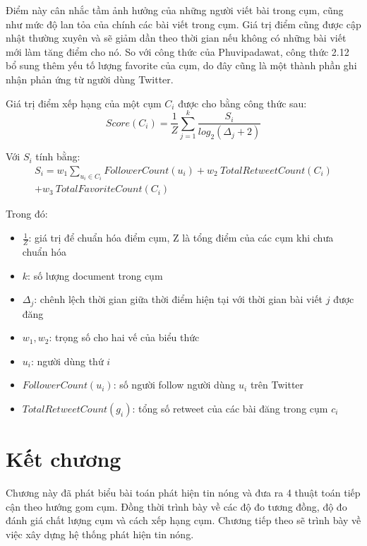 	Điểm này cân nhắc tầm ảnh hưởng của những người viết bài trong cụm, cũng như mức độ lan tỏa của chính các bài viết trong cụm. Giá trị điểm cũng được cập nhật thường xuyên và sẽ giảm dần theo thời gian nếu không có những bài viết mới làm tăng điểm cho nó. So với công thức của Phuvipadawat, công thức 2.12 bổ sung thêm yếu tố lượng favorite của cụm, do đây cũng là một thành phần ghi nhận phản ứng từ người dùng Twitter.
	
	Giá trị điểm xếp hạng của một cụm $C_i$ được cho bằng công thức sau:
	\begin{equation}
		Score(C_i) = \frac{1}{Z} \sum_{j = 1}^k \frac{S_i}{log_2(\Delta_j + 2)}
	\end{equation}
	
	Với $S_i$ tính bằng:
	\begin{multline}
	S_i = w_1 \sum_{u_i \in C_i} FollowerCount(u_i) + w_2\ TotalRetweetCount(C_i)\\ + w_3\ TotalFavoriteCount(C_i)
	\end{multline}

	Trong đó:
	\begin{itemize}
		\item $\frac{1}{Z}$: giá trị để chuẩn hóa điểm cụm, Z là tổng điểm của các cụm khi chưa chuẩn hóa
		\item $k$: số lượng document trong cụm
		\item $\Delta_j$: chênh lệch thời gian giữa thời điểm hiện tại với thời gian bài viết $j$ được đăng
		\item $w_1, w_2$: trọng số cho hai vế của biểu thức
		\item $u_i$: người dùng thứ $i$
		\item $FollowerCount(u_i)$: số người follow người dùng $u_i$ trên Twitter
		\item $TotalRetweetCount(g_i)$: tổng số retweet của các bài đăng trong cụm $c_i$
	\end{itemize}
\section{Kết chương}
Chương này đã phát biểu bài toán phát hiện tin nóng và đưa ra 4 thuật toán tiếp cận theo hướng gom cụm. Đồng thời trình bày về các độ đo tương đồng, độ đo đánh giá chất lượng cụm và cách xếp hạng cụm. Chương tiếp theo sẽ trình bày về việc xây dựng hệ thống phát hiện tin nóng.